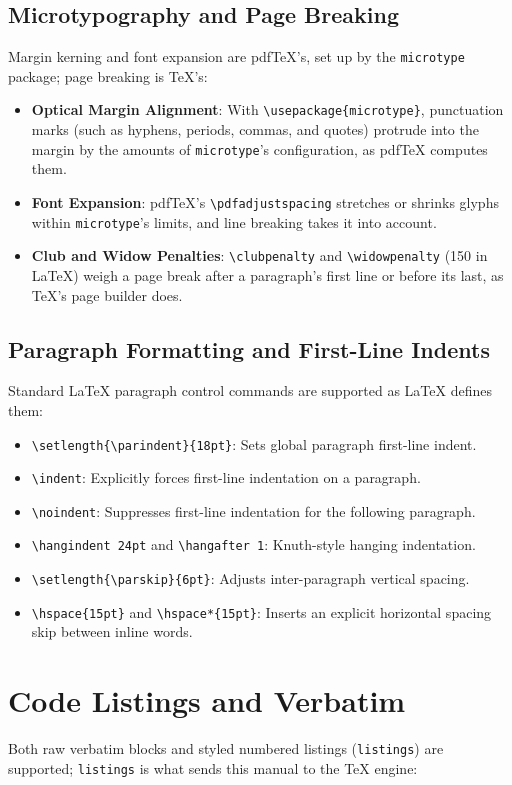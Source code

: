 \documentclass[11pt, a4paper]{article}
\begin{document}
\subsection{Microtypography and Page Breaking}
Margin kerning and font expansion are pdfTeX's, set up by the \texttt{microtype} package; page breaking is TeX's:
\begin{itemize}
\item \textbf{Optical Margin Alignment}: With \verb|\usepackage{microtype}|, punctuation marks (such as hyphens, periods, commas, and quotes) protrude into the margin by the amounts of \texttt{microtype}'s configuration, as pdfTeX computes them.
\item \textbf{Font Expansion}: pdfTeX's \verb|\pdfadjustspacing| stretches or shrinks glyphs within \texttt{microtype}'s limits, and line breaking takes it into account.
\item \textbf{Club and Widow Penalties}: \verb|\clubpenalty| and \verb|\widowpenalty| (150 in LaTeX) weigh a page break after a paragraph's first line or before its last, as TeX's page builder does.
\end{itemize}

\subsection{Paragraph Formatting and First-Line Indents}
Standard LaTeX paragraph control commands are supported as LaTeX defines them:
\begin{itemize}
\item \verb|\setlength{\parindent}{18pt}|: Sets global paragraph first-line indent.
\item \verb|\indent|: Explicitly forces first-line indentation on a paragraph.
\item \verb|\noindent|: Suppresses first-line indentation for the following paragraph.
\item \verb|\hangindent 24pt| and \verb|\hangafter 1|: Knuth-style hanging indentation.
\item \verb|\setlength{\parskip}{6pt}|: Adjusts inter-paragraph vertical spacing.
\item \verb|\hspace{15pt}| and \verb|\hspace*{15pt}|: Inserts an explicit horizontal spacing skip between inline words.
\end{itemize}

\section{Code Listings and Verbatim}
Both raw verbatim blocks and styled numbered listings (\texttt{listings}) are supported; \texttt{listings} is what sends this manual to the TeX engine:
\end{document}
